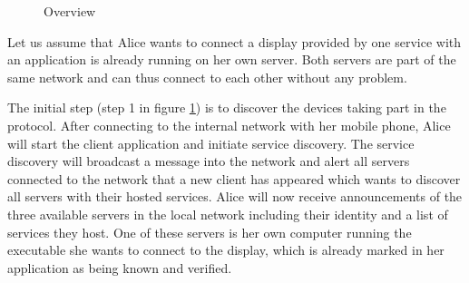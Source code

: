 \begin{figure}[t]
    \centering


    \caption{Overview}
    \label{fig:overview}
\end{figure}

Let us assume that Alice wants to connect a display provided by one service with an application is already running on her own server.
Both servers are part of the same network and can thus connect to each other without any problem.

The initial step (step 1 in figure \ref{fig:overview}) is to discover the devices taking part in the protocol.
After connecting to the internal network with her mobile phone, Alice will start the client application and initiate service discovery.
The service discovery will broadcast a message into the network and alert all servers connected to the network that a new client has appeared which wants to discover all servers with their hosted services.
Alice will now receive announcements of the three available servers in the local network including their identity and a list of services they host.
One of these servers is her own computer running the executable she wants to connect to the display, which is already marked in her application as being known and verified.

